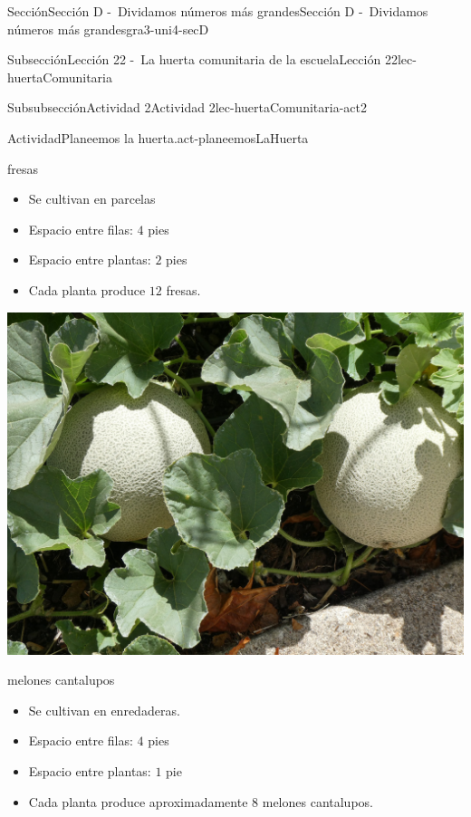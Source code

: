 \documentclass[twoside,10pt,]{article}
\begin{document}
\begin{sectionptx}{Sección}{Sección D -~Dividamos números más grandes}{}{Sección D -~Dividamos números más grandes}{}{}{gra3-uni4-secD}
\begin{subsectionptx}{Subsección}{Lección 22 -~La huerta comunitaria de la escuela}{}{Lección 22}{}{}{lec-huertaComunitaria}
\begin{subsubsectionptx}{Subsubsección}{Actividad 2}{}{Actividad 2}{}{}{lec-huertaComunitaria-act2}
\begin{activity}{Actividad}{Planeemos la huerta.}{act-planeemosLaHuerta}
\begin{sidebyside}{2}{0.025}{0.025}{0.05}
\begin{sbspanel}{0.45}
%
\par
fresas%
%
\begin{itemize}[label=\textbullet]
\item{}Se cultivan en parcelas%
\item{}Espacio entre filas: \(4\) pies%
\item{}Espacio entre plantas: \(2\) pies%
\item{}Cada planta produce \(12\) fresas.%
\end{itemize}
\end{sbspanel}%
\begin{sbspanel}{0.45}%
\includegraphics[width=\linewidth]{external/jpg-source/3-4-D-22 Act2-melon-cantalupo.jpg}
%
\par
melones cantalupos%
%
\begin{itemize}[label=\textbullet]
\item{}Se cultivan en enredaderas.%
\item{}Espacio entre filas: \(4\) pies%
\item{}Espacio entre plantas: \(1\) pie%
\item{}Cada planta produce aproximadamente \(8\) melones cantalupos.%
\end{itemize}
\end{sbspanel}%
\end{sidebyside}%
\begin{sidebyside}{2}{0.025}{0.025}{0.05}%
\begin{sbspanel}{0.45}%

\end{sbspanel}
\end{sidebyside}
\end{activity}
\end{subsubsectionptx}
\end{subsectionptx}
\end{sectionptx}
\end{document}
